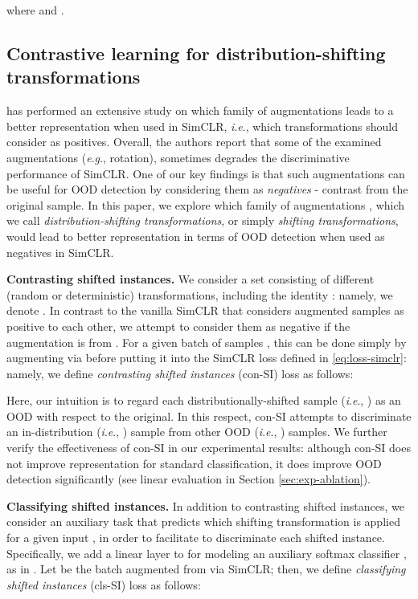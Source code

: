 \documentclass{article}
\newcommand{\ie}{\textit{i}.\textit{e}.}
\newcommand{\eg}{\textit{e}.\textit{g}.}
\begin{document}
where  and .

\vspace{-0.05in}
\subsection{Contrastive learning for distribution-shifting transformations}
\vspace{-0.05in}
\label{sec:method-train}

\citet{chen2020simple} has performed an extensive study on which family of augmentations  leads to a better representation when used in SimCLR, \ie, which transformations should  consider as positives. Overall, the authors report that some of the examined augmentations (\eg, rotation), sometimes degrades the discriminative performance of SimCLR. One of our key findings is that such augmentations can be useful for OOD detection by considering them as \emph{negatives} - contrast from the original sample. In this paper, we explore which family of augmentations , which we call \emph{distribution-shifting transformations}, or simply \emph{shifting transformations}, would lead to better representation in terms of OOD detection when used as negatives in SimCLR.

\textbf{Contrasting shifted instances.}
We consider a set  consisting of  different (random or deterministic) transformations, including the identity : namely, we denote . In contrast to the vanilla SimCLR that considers augmented samples as positive to each other, we attempt to consider them as negative if the augmentation is from . For a given batch of samples , this can be done simply by augmenting  via  before putting it into the SimCLR loss defined in \eqref{eq:loss-simclr}: namely, we define \emph{contrasting shifted instances} (con-SI) loss as follows:

Here, our intuition is to regard each distributionally-shifted sample (\ie, ) as an OOD with respect to the original. In this respect, con-SI attempts to discriminate an in-distribution (\ie, ) sample from other OOD (\ie, ) samples. We further verify the effectiveness of con-SI in our experimental results: although con-SI does not improve representation for standard classification, it does improve OOD detection significantly (see linear evaluation in Section \ref{sec:exp-ablation}).

\textbf{Classifying shifted instances.}
In addition to contrasting shifted instances, we consider an auxiliary task that predicts which shifting transformation  is applied for a given input , in order to facilitate  to discriminate each shifted instance.  Specifically, we add a linear layer to  for modeling an auxiliary softmax classifier , as in \citep{golan2018deep,hendrycks2019using_self,bergman2020classification}. Let  be the batch augmented from  via SimCLR; then, we define \textit{classifying shifted instances} (cls-SI) loss as follows:
\end{document}
